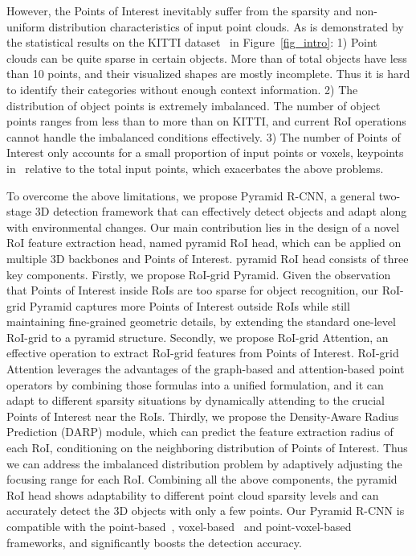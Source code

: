 \documentclass[10pt,twocolumn,letterpaper]{article}
\begin{document}
However, the Points of Interest inevitably suffer from the sparsity and non-uniform distribution characteristics of input point clouds. As is demonstrated by the statistical results on the KITTI dataset~\cite{geiger2013vision} in Figure~\ref{fig_intro}: 1) Point clouds can be quite sparse in certain objects. More than  of total objects have less than 10 points, and their visualized shapes are mostly incomplete. Thus it is hard to identify their categories without enough context information. 2) The distribution of object points is extremely imbalanced. The number of object points ranges from less than  to more than  on KITTI, and current RoI operations cannot handle the imbalanced conditions effectively. 3) The number of Points of Interest only accounts for a small proportion of input points or voxels, \eg  keypoints in~\cite{shi2020pv} relative to the  total input points, which exacerbates the above problems.

To overcome the above limitations, we propose Pyramid R-CNN, a general two-stage 3D detection framework that can effectively detect objects and adapt along with environmental changes. Our main contribution lies in the design of a novel RoI feature extraction head, named pyramid RoI head, which can be applied on multiple 3D backbones and Points of Interest. pyramid RoI head consists of three key components. Firstly, we propose RoI-grid Pyramid. Given the observation that Points of Interest inside RoIs are too sparse for object recognition, our RoI-grid Pyramid captures more Points of Interest outside RoIs while still maintaining fine-grained geometric details, by extending the standard one-level RoI-grid to a pyramid structure. Secondly, we propose RoI-grid Attention, an effective operation to extract RoI-grid features from Points of Interest. RoI-grid Attention leverages the advantages of the graph-based and attention-based point operators by combining those formulas into a unified formulation, and it can adapt to different sparsity situations by dynamically attending to the crucial Points of Interest near the RoIs. Thirdly, we propose the Density-Aware Radius Prediction (DARP) module, which can predict the feature extraction radius of each RoI, conditioning on the neighboring distribution of Points of Interest. Thus we can address the imbalanced distribution problem by adaptively adjusting the focusing range for each RoI. Combining all the above components, the pyramid RoI head shows adaptability to different point cloud sparsity levels and can accurately detect the 3D objects with only a few points. Our Pyramid R-CNN is compatible with the point-based~\cite{shi2019pointrcnn}, voxel-based~\cite{shi2020points} and point-voxel-based~\cite{shi2020pv} frameworks, and significantly boosts the detection accuracy.
\end{document}
